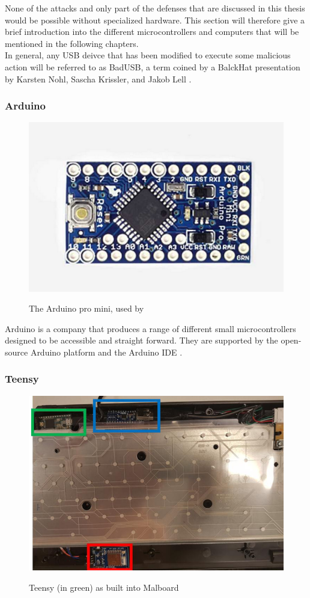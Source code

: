 None of the attacks and only part of the defenses that are discussed in this thesis would be possible without specialized hardware. This section will therefore give a brief introduction into the different microcontrollers and computers that will be mentioned in the following chapters.\\
In general, any USB deivce that has been modified to execute some malicious action will be referred to as BadUSB, a term coined by a BalckHat presentation by Karsten Nohl, Sascha Krissler, and Jakob Lell \cite{Srlabsbadusbblackhatv1Pdf2014} . 


\subsubsection{Arduino}

\begin{figure}[H]
    \centering
    \includegraphics[width=0.25\linewidth]{arduinomini.png}
    \caption{The Arduino pro mini, used by \cite{bojovicRisingThreatHardware2019}}
    \label{fig:ArduinoProMini}
    \cite{ArduinoProMini}
\end{figure}
Arduino \cite{ArduinoHardware} is a company that produces a range of different small microcontrollers designed to be accessible and straight forward. They are supported by the open-source Arduino platform and the Arduino IDE \cite{ArduinoArduino2024}.


\subsubsection{Teensy}

\begin{figure}[H]
    \centering
    \includegraphics[width=0.5\linewidth]{teensy.png}
    \caption{Teensy (in green) as built into Malboard}
    \label{fig:builtInTeensy}
    \cite{farhiMalboardNovelUser2019}
\end{figure}

